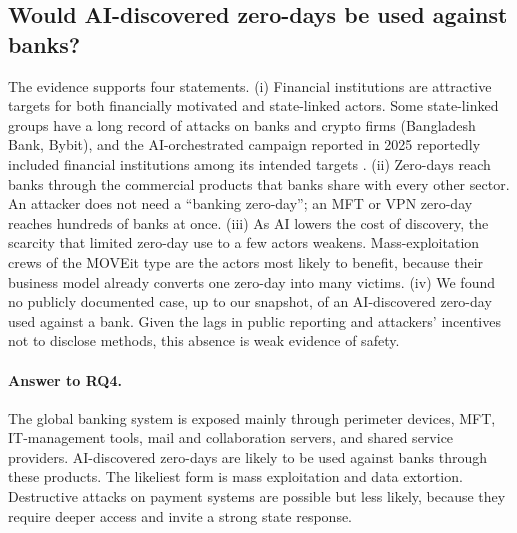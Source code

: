 \subsection{Would AI-discovered zero-days be used against banks?}
The evidence supports four statements. (i) Financial institutions are attractive targets for both financially motivated and state-linked actors. Some state-linked groups have a long record of attacks on banks and crypto firms (Bangladesh Bank, Bybit), and the AI-orchestrated campaign reported in 2025 reportedly included financial institutions among its intended targets \citep{anthropic2025espionage}. (ii) Zero-days reach banks through the commercial products that banks share with every other sector. An attacker does not need a ``banking zero-day''; an MFT or VPN zero-day reaches hundreds of banks at once. (iii) As AI lowers the cost of discovery, the scarcity that limited zero-day use to a few actors weakens. Mass-exploitation crews of the MOVEit type are the actors most likely to benefit, because their business model already converts one zero-day into many victims. (iv) We found no publicly documented case, up to our snapshot, of an AI-discovered zero-day used against a bank. Given the lags in public reporting and attackers' incentives not to disclose methods, this absence is weak evidence of safety.

\paragraph{Answer to RQ4.} The global banking system is exposed mainly through perimeter devices, MFT, IT-management tools, mail and collaboration servers, and shared service providers. AI-discovered zero-days are likely to be used against banks through these products. The likeliest form is mass exploitation and data extortion. Destructive attacks on payment systems are possible but less likely, because they require deeper access and invite a strong state response.
